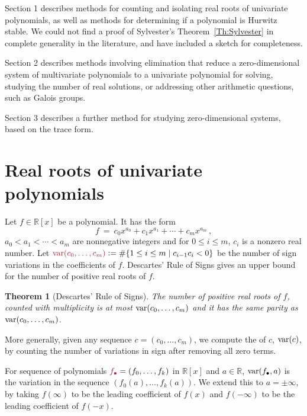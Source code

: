 \documentclass[12pt]{amsart}
\newtheorem{theorem}{Theorem}
\theoremstyle{definition}
\newcommand{\RR}{\mathbb{R}}
\DeclareMathOperator{\var}{{\rm var}}
\newcommand{\defcolor}[1]{{\color{Maroon}#1}}
\newcommand{\demph}[1]{\defcolor{{\sl #1}}}
\begin{document}
Section 1 describes methods for counting and isolating real roots of univariate polynomials, as well as methods for determining if a
polynomial is Hurwitz stable.
We could not find a proof of Sylvester's Theorem~\ref{Th:Sylvester} in complete generality in the literature, and have included a sketch for
completeness. 

Section 2 describes methods involving elimination that reduce a zero-dimensional system of multivariate polynomials to a univariate
polynomial for solving, studying the number of real solutions, or addressing other arithmetic questions, such as Galois groups.

Section 3 describes a further method for studying zero-dimensional systems, based on the trace form.


\section{Real roots of univariate polynomials}

Let $f\in\RR[x]$ be a polynomial.
It has the form
%
 \[
   f\ =\ c_{0}x^{a_{0}} + c_{1}x^{a_{1}} + \cdots + c_{m}x^{a_{m}}\,,
 \]
%
$a_{0} < a_{1} < \cdots < a_{m}$ are nonnegative integers and for $0\leq i \leq m$, $c_{i}$ is a nonzero real number.
Let $\defcolor{\var(c_0,\dotsc,c_m)}\vcentcolon=\#\{1\leq i\leq m\mid c_{i-1}c_i<0\}$ be the number of sign variations in the coefficients
of $f$.
Descartes' Rule of Signs \cite{So_Book} gives an upper bound for the number of positive real roots of $f$.

\begin{theorem}[Descartes' Rule of Signs]
  The number of positive real roots of $f$, counted with multiplicity is at most $\var(c_0,\dotsc,c_m)$ and it has the same parity
  as $\var(c_0,\dotsc,c_m)$.
\end{theorem}

More generally, given any sequence $c=(c_0,\dotsc,c_m)$, we compute the \demph{variation} of $c$, $\var(c)$, by counting the number of
variations in sign after removing all zero terms.
%
\begin{leftbar}

\end{leftbar}
%
For sequence of polynomials  $\defcolor{f_\bullet}=(f_0,\dotsc,f_k)$ in $\RR[x]$ and $a\in\RR$, \defcolor{$\var(f_\bullet,a)$} is the
variation in the sequence 
$(f_0(a),\dotsc,f_{k}(a))$. 
We extend this to $a=\pm\infty$, by taking $f(\infty)$ to be the leading coefficient of $f(x)$ and $f(-\infty)$ to be the leading
coefficient of $f(-x)$.
\end{document}
